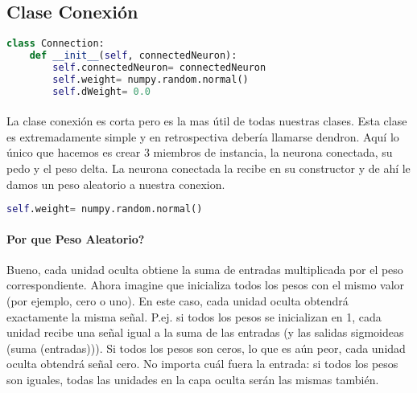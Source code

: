 \subsection{Clase Conexi\'on}
\begin{lstlisting}[language=Python]
class Connection:
	def __init__(self, connectedNeuron):
		self.connectedNeuron= connectedNeuron
		self.weight= numpy.random.normal()
		self.dWeight= 0.0
\end{lstlisting}
\paragraph{}La clase conexi\'on es corta pero es la mas \'util de todas nuestras clases. Esta clase es extremadamente simple y en retrospectiva deber\'ia llamarse dendron. Aqu\'i lo \'unico que hacemos es crear 3 miembros de instancia, la neurona conectada, su pedo y el peso delta. La neurona conectada la recibe en su constructor y de ah\'i le damos un peso aleatorio a nuestra conexion.
\begin{lstlisting}[language=Python]
self.weight= numpy.random.normal()
\end{lstlisting}
\paragraph{Por que Peso Aleatorio?}Bueno, cada unidad oculta obtiene la suma de entradas multiplicada por el peso correspondiente. Ahora imagine que inicializa todos los pesos con el mismo valor (por ejemplo, cero o uno). En este caso, cada unidad oculta obtendr\'a exactamente la misma se\~nal. P.ej. si todos los pesos se inicializan en 1, cada unidad recibe una se\~nal igual a la suma de las entradas (y las salidas sigmoideas (suma (entradas))). Si todos los pesos son ceros, lo que es a\'un peor, cada unidad oculta obtendr\'a se\~nal cero. No importa cu\'al fuera la entrada: si todos los pesos son iguales, todas las unidades en la capa oculta serán las mismas tambi\'en.
